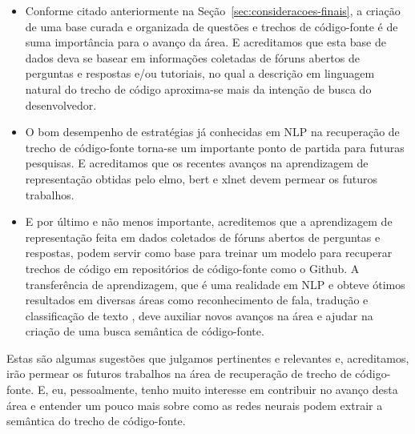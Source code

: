 \begin{itemize}
    \item Conforme citado anteriormente na Seção~\ref{sec:consideracoes-finais}, a criação de uma base curada e organizada de questões e trechos de código-fonte é de suma importância para o avanço da área. E acreditamos que esta base de dados deva se basear em informações coletadas de fóruns abertos de perguntas e respostas e/ou tutoriais, no qual a descrição em linguagem natural do trecho de código aproxima-se mais da intenção de busca do desenvolvedor.
    \item O bom desempenho de estratégias já conhecidas em NLP na recuperação de trecho de código-fonte torna-se um importante ponto de partida para futuras pesquisas. E acreditamos que os recentes avanços na aprendizagem de representação obtidas pelo \acrshort{elmo}, \acrshort{bert} e \Gls{xlnet} devem permear os futuros trabalhos. 
    \item E por último e não menos importante, acreditemos que a aprendizagem de representação feita em dados coletados de fóruns abertos de perguntas e respostas, podem servir como base para treinar um modelo para recuperar trechos de código em repositórios de código-fonte como o Github. A transferência de aprendizagem, que é uma realidade em NLP e obteve ótimos resultados em diversas áreas como reconhecimento de fala, tradução e classificação de texto \cite{devlin-etal-2019-bert}, deve auxiliar novos avanços na área e ajudar na criação de uma busca semântica de código-fonte.
\end{itemize}

Estas são algumas sugestões que julgamos pertinentes e relevantes e, acreditamos, irão permear os futuros trabalhos na área de recuperação de trecho de código-fonte. E, eu, pessoalmente, tenho muito interesse em contribuir no avanço desta área e entender um pouco mais sobre como as redes neurais podem extrair a semântica do trecho de código-fonte.
